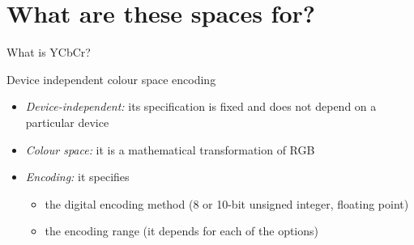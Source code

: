 \documentclass[aspectratio=169]{fireshonks}
\begin{document}
\section{What are these spaces for?}

\begin{frame}{What is YCbCr?}
  \begin{center}
    Device independent colour space encoding
  \end{center}

  \begin{itemize}[<+(1)->]
    \item \emph{Device-independent:} its specification is fixed and does not depend on a particular device
    \item \emph{Colour space:} it is a mathematical transformation of RGB
    \item \emph{Encoding:} it specifies
          \begin{itemize}
            \item the digital encoding method (8 or 10-bit unsigned integer, floating point)
            \item the encoding range (it depends for each of the options)
          \end{itemize}
  \end{itemize}
\end{frame}
\end{document}
